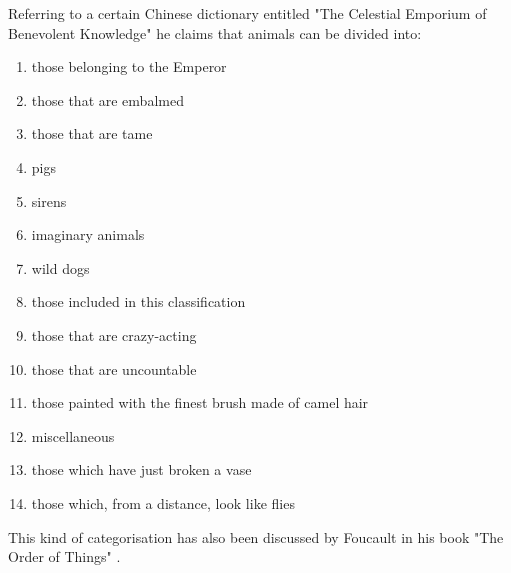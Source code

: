 Referring to a certain Chinese dictionary entitled "The Celestial Emporium of Benevolent Knowledge" he claims that animals can be divided into:

\begin{enumerate}
  \item	those belonging to the Emperor
  \item	those that are embalmed
  \item	those that are tame
  \item	pigs
  \item	sirens
  \item	imaginary animals
  \item	wild dogs
  \item	those included in this classification
  \item	those that are crazy-acting
  \item	those that are uncountable
  \item	those painted with the finest brush made of camel hair
  \item	miscellaneous
  \item	those which have just broken a vase
  \item	those which, from a distance, look like flies
\end{enumerate}

This kind of categorisation has also been discussed by Foucault in his book "The Order of Things" \citep{Foucault1966}.

%
